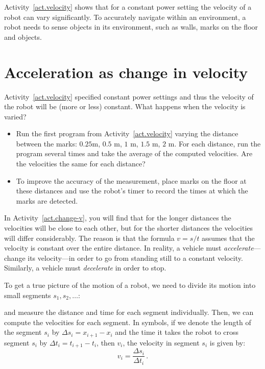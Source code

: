 Activity~\ref{act.velocity} shows that for a constant power setting the velocity of a robot can vary significantly. To accurately navigate within an environment, a robot needs to sense objects in its environment, such as walls, marks on the floor and objects.

\section{Acceleration as change in velocity}\label{s.acceleration}

Activity~\ref{act.velocity} specified constant power settings and thus the velocity of the robot will be (more or less) constant. What happens when the velocity is varied?


\begin{framed}
\begin{itemize}
\item Run the first program from Activity~\ref{act.velocity} varying the distance between the marks: $0.25$m, $0.5$ m, $1$ m, $1.5$ m, $2$ m. For each distance, run the program several times and take the average of the computed velocities. Are the velocities the same for each distance?
\item To improve the accuracy of the measurement, place marks on the floor at these distances and use the robot's timer to record the times at which the marks are detected.
\end{itemize}
\end{framed}

In Activity~\ref{act.change-v}, you will find that for the longer distances the velocities will be close to each other, but for the shorter distances the velocities will differ considerably. The reason is that the formula $v=s/t$ assumes that the velocity is constant over the entire distance. In reality, a vehicle must \emph{accelerate}---change its velocity---in order to go from standing still to a constant velocity. Similarly, a vehicle must \emph{decelerate} in order to stop.

To get a true picture of the motion of a robot, we need to divide its motion into small segments $s_1,s_2,\ldots$:
\begin{center}
\end{center}
and measure the distance and time for each segment individually. Then, we can compute the velocities for each segment. In symbols, if we denote the length of the segment $s_i$ by $\Delta s_i = x_{i+1}-x_i$ and the time it takes the robot to cross segment $s_i$ by $\Delta t_i = t_{i+1}-t_i$, then $v_i$, the velocity in segment $s_i$ is given by:
\[v_i = \frac{\Delta s_i}{\Delta t_i}\,.\]

